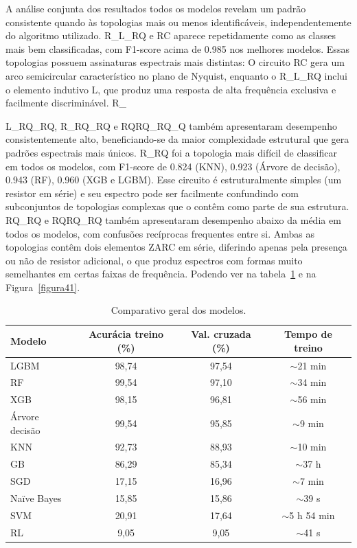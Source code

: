 A análise conjunta dos resultados todos os modelos revelam um padrão consistente
quando às topologias mais ou menos identificáveis, independentemente do algoritmo utilizado.
R\_L\_RQ e RC aparece repetidamente como as classes mais bem classificadas, com F1-score
acima de 0.985 nos melhores modelos. Essas topologias possuem assinaturas espectrais mais
distintas: O circuito RC gera um arco semicircular característico no plano de Nyquist, enquanto
o R\_L\_RQ inclui o elemento indutivo L, que produz uma resposta de alta frequência exclusiva
e facilmente discriminável. R\_{L\_RQ\_RQ, R\_{RQ\_RQ} e R{QRQ\_RQ\_Q} também apresentaram
desempenho consistentemente alto, beneficiando-se da maior complexidade estrutural que gera
padrões espectrais mais únicos. R\_RQ foi a topologia mais difícil de classificar em todos os
modelos, com F1-score de 0.824 (KNN), 0.923 (Árvore de decisão), 0.943 (RF), 0.960 (XGB
e LGBM). Esse circuito é estruturalmente simples (um resistor em série) e seu espectro pode
ser facilmente confundindo com subconjuntos de topologias complexas que o contêm como
parte de sua estrutura. RQ\_RQ e RQRQ\_RQ também apresentaram desempenho abaixo da
média em todos os modelos, com confusões recíprocas frequentes entre si. Ambas as topologias
contêm dois elementos ZARC em série, diferindo apenas pela presença ou não de resistor
adicional, o que produz espectros com formas muito semelhantes em certas faixas de
frequência. Podendo ver na tabela~\ref{tab:3} e na Figura~\ref{figura41}.

\begin{table}[htb]
\caption{Comparativo geral dos modelos.}
\label{tab:3}
\centering
\begin{tabular}{lccc}
\toprule
\textbf{Modelo} & \textbf{Acurácia treino (\%)} & \textbf{Val. cruzada (\%)} & \textbf{Tempo de treino} \\
\midrule
LGBM            & 98,74 & 97,54 & $\sim$21 min \\
RF              & 99,54 & 97,10 & $\sim$34 min \\
XGB             & 98,15 & 96,81 & $\sim$56 min \\
Árvore decisão  & 99,54 & 95,85 & $\sim$9 min  \\
KNN             & 92,73 & 88,93 & $\sim$10 min \\
GB              & 86,29 & 85,34 & $\sim$37 h   \\
SGD             & 17,15 & 16,96 & $\sim$7 min  \\
Naïve Bayes     & 15,85 & 15,86 & $\sim$39 s   \\
SVM             & 20,91 & 17,64 & $\sim$5 h 54 min \\
RL              & 9,05  & 9,05  & $\sim$41 s   \\
\bottomrule
\end{tabular}
\end{table}

}
